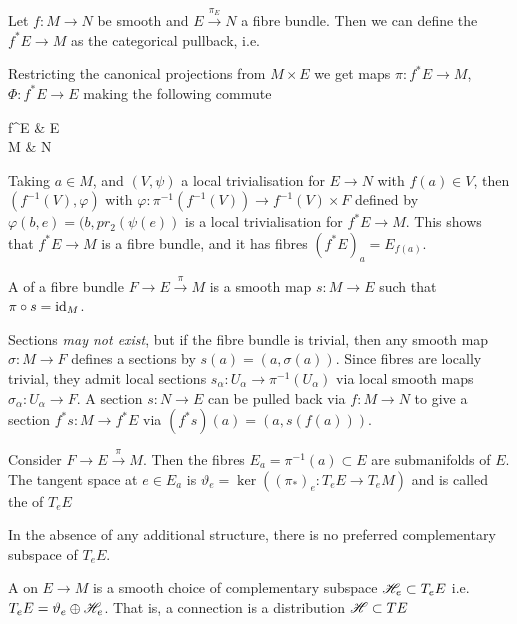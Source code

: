 \documentclass{article}
\begin{document}
\begin{definition}
	Let $f:M \to  N$ be smooth and $E \overset{\pi_E}{\to} N$ a fibre bundle. Then we can define the  $f^\ast E \to M$ as the categorical pullback, i.e. 
\end{definition}
Restricting the canonical projections from $M \times E$ we get maps $\pi : f^\ast E \to M$, $\Phi:f^\ast E \to E$ making the following commute 
\begin{tkz}
	f^\ast E \arrow[r,"\Phi"] \arrow[d,"\pi"'] & E \arrow[d,"\pi_E"] \\ M \arrow[r,"f"] & N
\end{tkz}
Taking $ a \in M$, and $(V, \psi)$ a local trivialisation for $E \to N$ with $f(a) \in V$, then $(f^{-1}(V),\varphi)$ with $\varphi: \pi^{-1}(f^{-1}(V)) \to f^{-1}(V) \times F$ defined by $\varphi(b,e) = (b,pr_2(\psi(e))$ is a local trivialisation for $f^\ast E \to M$. This shows that $f^\ast E \to M$ is a fibre bundle, and it has fibres $(f^\ast E)_a = E_{f(a)}$. 

\begin{definition}
	A  of a fibre bundle $F \to E \overset{\pi}{\to} M$ is a smooth map $s:M \to E$ such that $\pi\circ s = \operatorname{id}_M$. 
\end{definition}

Sections \emph{may not exist}, but if the fibre bundle is trivial, then any smooth map $\sigma : M \to F$ defines a sections by $s(a) = (a,\sigma(a))$. Since fibres are locally trivial, they admit local sections $s_\alpha : U_\alpha \to \pi^{-1}(U_\alpha)$ via local smooth maps $\sigma_\alpha : U_\alpha \to F$. A section $s:N \to E$ can be pulled back via $f:M \to N$ to give a section $f^\ast s : M \to f^\ast E$ via $(f^\ast s)(a) = (a,s(f(a)))$. 

\begin{definition}
	Consider $F \to E \overset{\pi}{\to} M$. Then the fibres $E_a = \pi^{-1}(a) \subset E$ are submanifolds of $E$. The tangent space at $e \in E_a$ is $\vartheta_e = \ker((\pi_\ast)_e : T_e E \to T_e M)$ and is called the  of $T_eE$
\end{definition}
In the absence of any additional structure, there is no preferred complementary subspace of $T_eE$.

\begin{definition}
	A  on $E \to M$ is a smooth choice of complementary subspace $\mathscr{H}_e \subset T_e E$ i.e. $T_eE = \vartheta_e \oplus \mathscr{H}_e$. That is, a connection is a distribution $\mathscr{H}\subset TE$
\end{definition}
\end{document}
